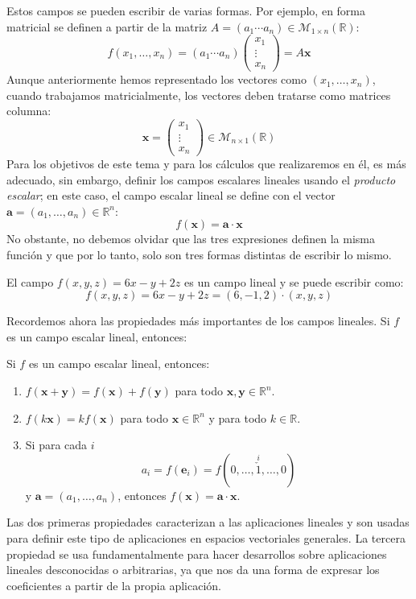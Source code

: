 Estos campos se pueden escribir de varias formas. Por ejemplo, en forma matricial se definen a partir de la matriz $A=(a_1 \cdots a_n)\in \mathcal{M}_{1\times n}(\mathbb{R})$:
\[
f(x_1,\dots,x_n) = (a_1 \cdots a_n)
\begin{pmatrix}
x_1\\
\vdots\\
x_n
\end{pmatrix}
= A\boldsymbol x
\]
Aunque anteriormente hemos representado los vectores como $(x_1,\dots,x_n)$, cuando trabajamos matricialmente, los vectores deben tratarse como matrices columna:
\[
\boldsymbol x = \begin{pmatrix}
x_1\\
\vdots\\
x_n
\end{pmatrix}
\in \mathcal{M}_{n\times 1}(\mathbb{R})
\]
Para los objetivos de este tema y para los cálculos que realizaremos en él, es más adecuado, sin embargo, definir los campos escalares lineales usando el \emph{producto escalar};
en este caso, el campo escalar lineal se define con el vector $\boldsymbol a=(a_1,\dots, a_n)\in \mathbb{R}^n$:
\[
f(\boldsymbol x) = \boldsymbol a\cdot \boldsymbol x
\]
No obstante, no debemos olvidar que las tres expresiones definen la misma función y que por lo tanto, solo son tres formas distintas de escribir lo mismo.
%
\begin{ejemplo}
El campo $f(x,y,z)=6x-y+2z$ es un campo lineal y se puede escribir como:
\begin{equation}
f(x,y,z)=6x-y+2z=(6,-1,2)\cdot (x,y,z)
\tag*{\fej}
\end{equation}
\end{ejemplo}
%
Recordemos ahora las propiedades más importantes de los campos lineales.
Si $f$ es un campo escalar lineal, entonces:
\begin{teorema}\label{teo:aplin}
Si $f$ es un campo escalar lineal, entonces:\vspace{-1em}
\begin{enumerate}
\item
$f(\boldsymbol x+\boldsymbol y) = f(\boldsymbol x)+f(\boldsymbol y)$ para todo $\boldsymbol x,\boldsymbol y\in\mathbb{R}^n$.
\item
$f(k\boldsymbol x) = kf(\boldsymbol x)$ para todo $\boldsymbol x\in\mathbb{R}^n$ y para todo $k\in\mathbb{R}$.
\item
Si para cada $i$ 
\[
a_i=f(\boldsymbol e_i)=f(0,\dots,\stackrel{i}{\check1},\dots,0)
\]
y $\boldsymbol a=(a_1,\dots,a_n)$, entonces $f(\boldsymbol x)=\boldsymbol a\cdot\boldsymbol x$.
\end{enumerate}
\end{teorema}
%
Las dos primeras propiedades caracterizan a las aplicaciones lineales y son usadas para definir este tipo de aplicaciones en espacios vectoriales generales.
La tercera propiedad se usa fundamentalmente para hacer desarrollos sobre aplicaciones lineales desconocidas o arbitrarias, ya que nos da una forma de expresar los coeficientes a partir de la propia aplicación.

